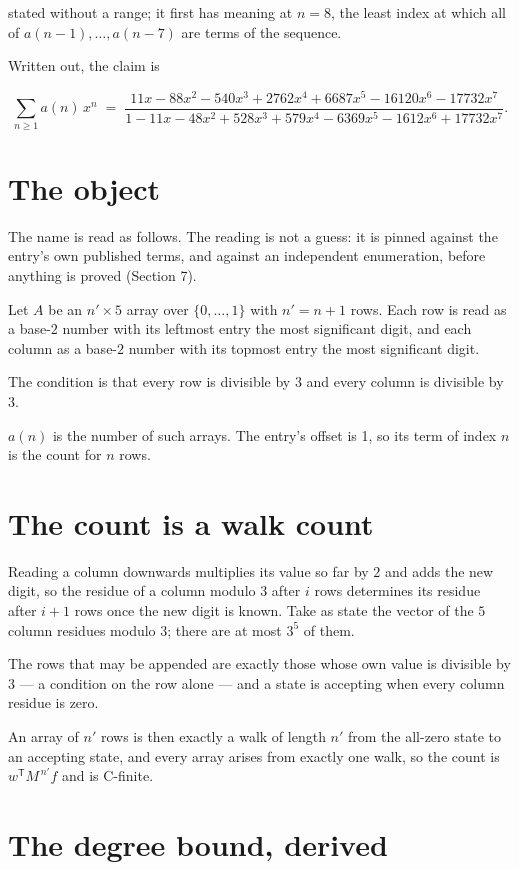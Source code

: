 \documentclass[11pt]{article}
\theoremstyle{definition}
\begin{document}
stated without a range; it first has meaning at $n = 8$, the least index at which all of $a(n-1),\dots,a(n-7)$ are terms of the sequence.

Written out, the claim is

\[\sum_{n \ge 1} a(n)\,x^n \;=\; \frac{11x - 88x^{2} - 540x^{3} + 2762x^{4} + 6687x^{5} - 16120x^{6} - 17732x^{7}}{1 - 11x - 48x^{2} + 528x^{3} + 579x^{4} - 6369x^{5} - 1612x^{6} + 17732x^{7}}.\]

\section{The object}

The name is read as follows. The reading is not a guess: it is pinned against the entry's own published terms, and against an independent enumeration, before anything is proved (Section 7).

Let $A$ be an $n' \times 5$ array over $\{0,\dots,1\}$ with $n' = n + 1$ rows. Each row is read as a base-$2$ number with its leftmost entry the most significant digit, and each column as a base-$2$ number with its topmost entry the most significant digit.

The condition is that every row is divisible by $3$ and every column is divisible by $3$.

$a(n)$ is the number of such arrays. The entry's offset is 1, so its term of index $n$ is the count for $n$ rows.

\section{The count is a walk count}

Reading a column downwards multiplies its value so far by $2$ and adds the new digit, so the residue of a column modulo $3$ after $i$ rows determines its residue after $i+1$ rows once the new digit is known. Take as state the vector of the $5$ column residues modulo $3$; there are at most $3^{5}$ of them.

The rows that may be appended are exactly those whose own value is divisible by $3$ --- a condition on the row alone --- and a state is accepting when every column residue is zero.

An array of $n'$ rows is then exactly a walk of length $n'$ from the all-zero state to an accepting state, and every array arises from exactly one walk, so the count is $w^{\mathsf T}M^{\,n'}f$ and is C-finite.

\section{The degree bound, derived}
\end{document}
